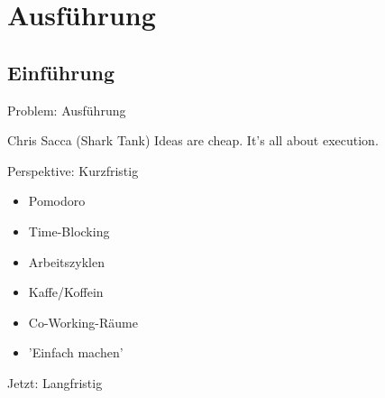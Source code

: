 \section{Ausführung}

\subsection{Einführung}

\begin{frame}[c]{Problem: Ausführung}
    \large
    \begin{aquote}{Chris Sacca (Shark Tank)}
        Ideas are cheap. It's all about execution.
    \end{aquote}
\end{frame}


\begin{frame}[c]{Perspektive: Kurzfristig}
    \large
    \begin{itemize}
        \item Pomodoro
        \item Time-Blocking
        \item Arbeitszyklen
        \item Kaffe/Koffein
        \item Co-Working-Räume
        \item 'Einfach machen'
    \end{itemize}
\end{frame}


\addtocounter{framenumber}{1}
\begin{frame}[standout]
    \Large
    Jetzt: Langfristig
\end{frame}

%
%
%
%
%


